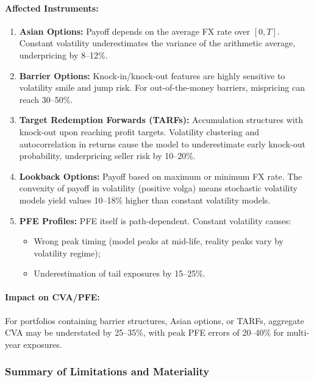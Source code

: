 \paragraph{Affected Instruments:}
\begin{enumerate}
	\item \textbf{Asian Options:} Payoff depends on the average FX rate over $[0,T]$. Constant volatility underestimates the variance of the arithmetic average, underpricing by 8--12\%.
	
	\item \textbf{Barrier Options:} Knock-in/knock-out features are highly sensitive to volatility smile and jump risk. For out-of-the-money barriers, mispricing can reach 30--50\%.
	
	\item \textbf{Target Redemption Forwards (TARFs):} Accumulation structures with knock-out upon reaching profit targets. Volatility clustering and autocorrelation in returns cause the model to underestimate early knock-out probability, underpricing seller risk by 10--20\%.
	
	\item \textbf{Lookback Options:} Payoff based on maximum or minimum FX rate. The convexity of payoff in volatility (positive volga) means stochastic volatility models yield values 10--18\% higher than constant volatility models.
	
	\item \textbf{PFE Profiles:} PFE itself is path-dependent. Constant volatility causes:
	\begin{itemize}
		\item Wrong peak timing (model peaks at mid-life, reality peaks vary by volatility regime);
		\item Underestimation of tail exposures by 15--25\%.
	\end{itemize}
\end{enumerate}

\paragraph{Impact on CVA/PFE:}
For portfolios containing barrier structures, Asian options, or TARFs, aggregate CVA may be understated by 25--35\%, with peak PFE errors of 20--40\% for multi-year exposures.

\subsubsection{Summary of Limitations and Materiality}

